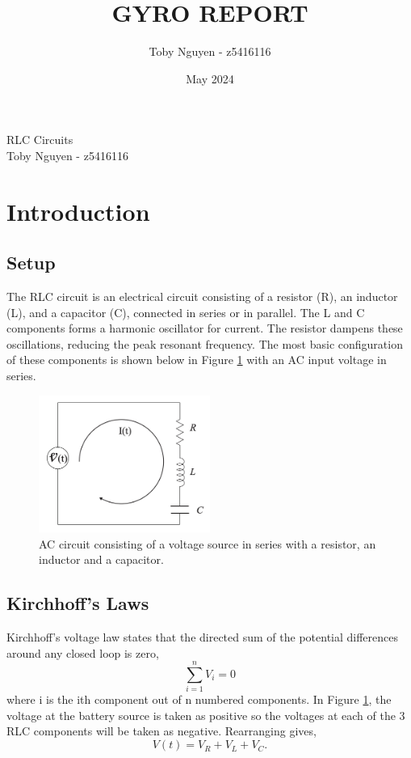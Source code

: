 \documentclass{article}
\title{GYRO REPORT}
\author{Toby Nguyen - z5416116}
\date{May 2024}
\begin{document}
\begin{center}
    \huge{RLC Circuits} \\[10pt]
    \large{Toby Nguyen - z5416116}
\end{center}
\tableofcontents
\newpage
\section{Introduction}
\subsection{Setup}
The RLC circuit is an electrical circuit consisting of a resistor (R), 
an inductor (L), and a capacitor (C), connected in series or in parallel.
The L and C components forms a harmonic oscillator for current. The resistor 
dampens these oscillations, reducing the peak resonant frequency. The most 
basic configuration of these components is shown below in Figure 
\ref{fig:circuit1} with an AC input voltage in series.

\begin{figure}[H]
    \centering
    \includegraphics[width=0.5\textwidth]{circuit.png}
    \caption{AC circuit consisting of a voltage source in series with 
    a resistor, an inductor and a capacitor.}
    \label{fig:circuit1}
\end{figure}

\subsection{Kirchhoff's Laws}
Kirchhoff's voltage law states that the directed sum of the potential
differences around any closed loop is zero,
\begin{equation}
    \sum_{i=1}^{n} V_i = 0
\end{equation}
where i is the ith component out of n numbered components. In Figure 
\ref{fig:circuit1}, the voltage at the battery source is taken as positive
so the voltages at each of the 3 RLC components will be taken as negative.
Rearranging gives,
\begin{equation}
    V(t) = V_{R} + V_{L} + V_{C}.
\end{equation}
\end{document}
